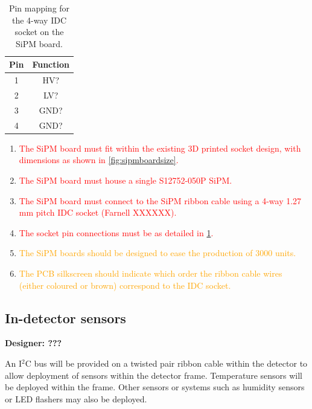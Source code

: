 \documentclass[a4paper]{article}
\newcommand{\must}[1]{\textcolor{red}{#1}}
\newcommand{\should}[1]{\textcolor{orange}{#1}}
\def\I2C{I$^2$C}
\begin{document}
\begin{table}[h]
    \begin{center}
        \caption{Pin mapping for the 4-way IDC socket on the SiPM board.}
        \label{tab:IDC4waySiPM}
        \begin{tabular}{cc}
            \hline
            \hline
            Pin & Function \\
            \hline
            1 & HV? \\
            2 & LV? \\
            3 & GND? \\
            4 & GND? \\
            \hline
            \hline
        \end{tabular}
    \end{center}
\end{table}

\begin{enumerate}
    \item \must{The SiPM board must fit within the existing 3D printed socket design, with dimensions as shown in \cref{fig:sipmboardsize}.}
    \item \must{The SiPM board must house a single S12752-050P SiPM.}
    \item \must{The SiPM board must connect to the SiPM ribbon cable using a 4-way 1.27 mm pitch IDC socket (Farnell XXXXXX).}
    \item \must{The socket pin connections must be as detailed in \cref{tab:IDC4waySiPM}.}
    \item \should{The SiPM boards should be designed to ease the production of 3000 units.}
    \item \should{The PCB silkscreen should indicate which order the ribbon cable wires (either coloured or brown) correspond to the IDC socket.}
\end{enumerate}

\clearpage
\newpage
\subsection{In-detector sensors}

{\bf Designer: ???}

An \I2C bus will be provided on a twisted pair ribbon cable within the detector to allow deployment of sensors within the detector frame.
Temperature sensors will be deployed within the frame.
Other sensors or systems such as humidity sensors or LED flashers may also be deployed.
\end{document}
